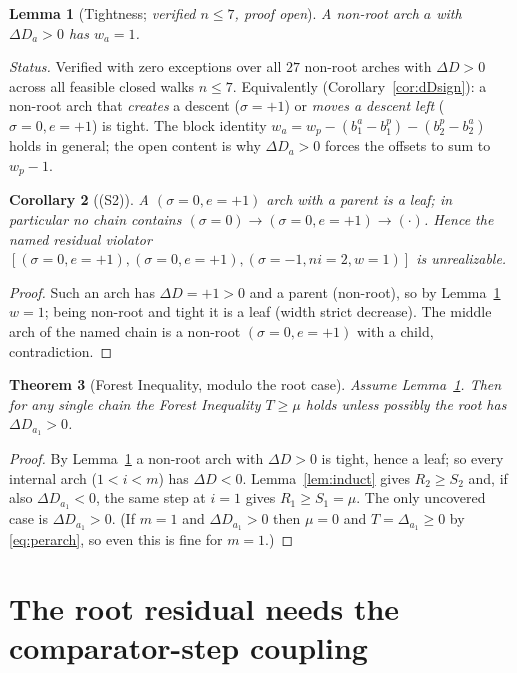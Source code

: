 \documentclass[11pt]{article}
\theoremstyle{plain}
\newtheorem{theorem}{Theorem}
\newtheorem{lemma}[theorem]{Lemma}
\newtheorem{corollary}[theorem]{Corollary}
\theoremstyle{definition}
\theoremstyle{remark}
\newcommand{\dD}{\Delta D}
\begin{document}
\begin{lemma}[Tightness; \emph{verified $n\le7$, proof open}]\label{lem:tight}
A non-root arch $a$ with $\dD_a>0$ has $w_a=1$.
\end{lemma}

\noindent\emph{Status.} Verified with zero exceptions over all $27$ non-root arches with
$\dD>0$ across all feasible closed walks $n\le7$. Equivalently (Corollary~\ref{cor:dDsign}):
a non-root arch that \emph{creates} a descent ($\sigma=+1$) or \emph{moves a descent left}
($\sigma=0,e=+1$) is tight. The block identity
$w_a=w_p-(b_1^a-b_1^p)-(b_2^p-b_2^a)$ holds in general; the open content is why $\dD_a>0$
forces the offsets to sum to $w_p-1$.

\begin{corollary}[(S2)]\label{cor:s2}
A $(\sigma=0,e=+1)$ arch with a parent is a leaf; in particular no chain contains
$(\sigma=0)\to(\sigma=0,e=+1)\to(\cdot)$. Hence the named residual violator
$[(\sigma{=}0,e{=}{+}1),(\sigma{=}0,e{=}{+}1),(\sigma{=}-1,ni{=}2,w{=}1)]$ is unrealizable.
\end{corollary}
\begin{proof}
Such an arch has $\dD=+1>0$ and a parent (non-root), so by Lemma~\ref{lem:tight} $w=1$;
being non-root and tight it is a leaf (width strict decrease). The middle arch of the named
chain is a non-root $(\sigma=0,e=+1)$ with a child, contradiction.
\end{proof}

\begin{theorem}[Forest Inequality, modulo the root case]\label{thm:forestmod}
Assume Lemma~\ref{lem:tight}. Then for any single chain the Forest Inequality $T\ge\mu$ holds
\emph{unless} possibly the root has $\dD_{a_1}>0$.
\end{theorem}
\begin{proof}
By Lemma~\ref{lem:tight} a non-root arch with $\dD>0$ is tight, hence a leaf; so every
internal arch ($1<i<m$) has $\dD<0$. Lemma~\ref{lem:induct} gives $R_2\ge S_2$ and, if also
$\dD_{a_1}<0$, the same step at $i=1$ gives $R_1\ge S_1=\mu$. The only uncovered case is
$\dD_{a_1}>0$. (If $m=1$ and $\dD_{a_1}>0$ then $\mu=0$ and $T=\Delta_{a_1}\ge0$ by
\eqref{eq:perarch}, so even this is fine for $m=1$.)
\end{proof}

\section{The root residual needs the comparator-step coupling}
\end{document}
